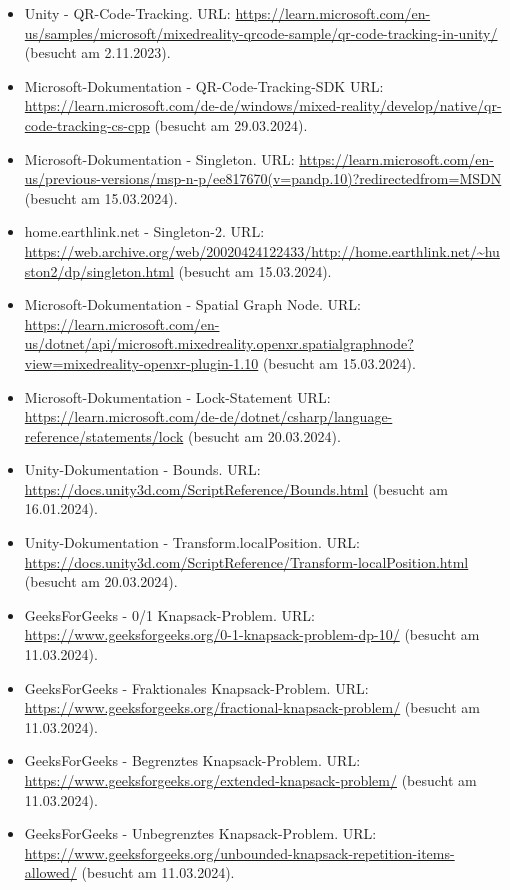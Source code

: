 \begin{itemize}[leftmargin=0pt]
    \item Unity - QR-Code-Tracking. {\scriptsize URL:} \url{https://learn.microsoft.com/en-us/samples/microsoft/mixedreality-qrcode-sample/qr-code-tracking-in-unity/} (besucht am 2.11.2023).
    \item Microsoft-Dokumentation - QR-Code-Tracking-SDK {\scriptsize URL:} \url{https://learn.microsoft.com/de-de/windows/mixed-reality/develop/native/qr-code-tracking-cs-cpp} (besucht am 29.03.2024).
    \item Microsoft-Dokumentation - Singleton. {\scriptsize URL:} \url{https://learn.microsoft.com/en-us/previous-versions/msp-n-p/ee817670(v=pandp.10)?redirectedfrom=MSDN} (besucht am 15.03.2024).
    \item home.earthlink.net - Singleton-2. {\scriptsize URL:} \url{https://web.archive.org/web/20020424122433/http://home.earthlink.net/~huston2/dp/singleton.html} (besucht am 15.03.2024).
    \item Microsoft-Dokumentation - Spatial Graph Node. {\scriptsize URL:} \url{https://learn.microsoft.com/en-us/dotnet/api/microsoft.mixedreality.openxr.spatialgraphnode?view=mixedreality-openxr-plugin-1.10} (besucht am 15.03.2024).
    \item Microsoft-Dokumentation - Lock-Statement {\scriptsize URL:} \url{https://learn.microsoft.com/de-de/dotnet/csharp/language-reference/statements/lock} (besucht am 20.03.2024).
    \item Unity-Dokumentation - Bounds. {\scriptsize URL:} \url{https://docs.unity3d.com/ScriptReference/Bounds.html} (besucht am 16.01.2024).
    \item Unity-Dokumentation - Transform.localPosition. {\scriptsize URL:} \url{https://docs.unity3d.com/ScriptReference/Transform-localPosition.html} (besucht am 20.03.2024).
    \item GeeksForGeeks - 0/1 Knapsack-Problem. {\scriptsize URL:} \url{https://www.geeksforgeeks.org/0-1-knapsack-problem-dp-10/} (besucht am 11.03.2024).
    \item GeeksForGeeks - Fraktionales Knapsack-Problem. {\scriptsize URL:} \url{https://www.geeksforgeeks.org/fractional-knapsack-problem/} (besucht am 11.03.2024).
    \item GeeksForGeeks - Begrenztes Knapsack-Problem. {\scriptsize URL:} \url{https://www.geeksforgeeks.org/extended-knapsack-problem/} (besucht am 11.03.2024).
    \item GeeksForGeeks - Unbegrenztes Knapsack-Problem. {\scriptsize URL:} \url{https://www.geeksforgeeks.org/unbounded-knapsack-repetition-items-allowed/} (besucht am 11.03.2024).

\end{itemize}
